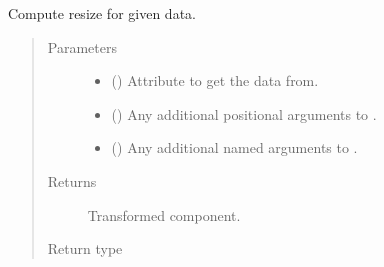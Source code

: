 \documentclass[letterpaper,10pt,english]{sphinxmanual}
\begin{document}
\begin{fulllineitems}
\begin{fulllineitems}
\label{\detokenize{api/base_classes:geology.src.base_spatial.SpatialComponent.resize}}
Compute resize for given data.
\begin{quote}\begin{description}
\item[{Parameters}] \leavevmode\begin{itemize}
\item {} 
 (\sphinxstyleliteralemphasis{\sphinxupquote{, }}) \textendash{} Attribute to get the data from.

\item {} 
 () \textendash{} Any additional positional arguments to .

\item {} 
 () \textendash{} Any additional named arguments to .

\end{itemize}

\item[{Returns}] \leavevmode
{} \textendash{} Transformed component.

\item[{Return type}] \leavevmode
{\hyperref[\detokenize{api/base_classes:geology.src.base_spatial.SpatialComponent}]{}}

\end{description}\end{quote}

\end{fulllineitems}



\end{fulllineitems}
\end{document}
